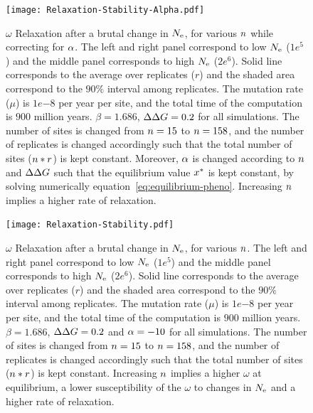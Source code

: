 \begin{figure}[H]
	\centering
	\texttt{[image: Relaxation-Stability-Alpha.pdf]}
	\caption[Relaxation time of $\omega$ dependence on $\NbrSites$, while correction for $\DeltaGmin$]{
	$\omega$ Relaxation after a brutal change in $N_{\mathrm{e}}$, for various $\NbrSites$ while correcting for $\DeltaGmin$.
	The left and right panel correspond to low $N_{\mathrm{e}}$ ($1e^{5}$) and the middle panel corresponds to high $N_{\mathrm{e}}$ ($2e^{6}$).
	Solid line corresponds to the average over replicates ($r$) and the shaded area correspond to the $90\%$ interval among replicates.
	The mutation rate ($\mu$) is $1e{-8}$ per year per site, and the total time of the computation is $900$ million years.
	$\beta=1.686$, $\Delta \Delta G=0.2$ for all simulations. The number of sites is changed from $n=15$ to $n=158$, and the number of replicates is changed accordingly such that the total number of sites ($n*r$) is kept constant.
	Moreover, $\DeltaGmin$ is changed according to $\NbrSites$ and $\Delta \Delta G$ such that the equilibrium value $x^{*}$ is kept constant, by solving numerically equation~\ref{eq:equilibrium-pheno}.
	Increasing $\NbrSites$ implies a higher rate of relaxation.}
\end{figure}

\begin{figure}[H]
	\centering
	\texttt{[image: Relaxation-Stability.pdf]}
	\caption[Relaxation time of $\omega$ dependence on $\NbrSites$]{
	$\omega$ Relaxation after a brutal change in $N_{\mathrm{e}}$, for various $\NbrSites$.
	The left and right panel correspond to low $N_{\mathrm{e}}$ ($1e^{5}$) and the middle panel corresponds to high $N_{\mathrm{e}}$ ($2e^{6}$).
	Solid line corresponds to the average over replicates ($r$) and the shaded area correspond to the $90\%$ interval among replicates.
	The mutation rate ($\mu$) is $1e{-8}$ per year per site, and the total time of the computation is $900$ million years.
	$\beta=1.686$, $\Delta \Delta G=0.2$ and $\alpha=-10$ for all simulations. The number of sites is changed from $n=15$ to $n=158$, and the number of replicates is changed accordingly such that the total number of sites ($n*r$) is kept constant.
	Increasing $\NbrSites$ implies a higher $\omega$ at equilibrium, a lower susceptibility of the $\omega$ to changes in $N_{\mathrm{e}}$ and a higher rate of relaxation.
	}
\end{figure}

